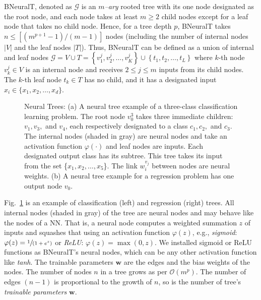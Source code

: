 \documentclass[11pt,a4paper]{article}
\begin{document}
    BNeuralT, denoted as $ \mathcal{G} $ is an \textit{$ m $--ary} rooted tree with its one node designated as the root node, and each node takes at least $ m \ge 2$ child nodes except for a leaf node that takes no child node. Hence, for a tree depth $ p $, BNeuralT takes $ n \le [(m^{p+1}-1)/(m-1)]$ nodes (including the number of internal nodes $ |V| $ and the leaf nodes $|T|$). Thus, BNeuralT can be defined as a union of internal and leaf nodes    
$
    \mathcal{G} = V \cup T = \left\lbrace v^j_1,v^j_2,\ldots,v^j_K \right\rbrace  \cup \left\lbrace t_1, t_2,\ldots, t_L \right\rbrace 
    $
where $ k $-th node $ v^j_k \in V$ is an internal node and receives $ 2 \le j \le m $ inputs from its child nodes. The $ k $-th leaf node $ t_k \in T$ has no child, and it has a designated input $ x_i \in  \{x_1,x_2,\ldots,x_d\}$. 
    
    \begin{figure}
        \centering
        \caption{Neural Trees: (a) A neural tree example of a three-class classification learning problem. The root node $ v^3_0 $ takes three immediate children: $ v_1, v_3, $ and $ v_4 $, each respectively designated to a class $ c_1, c_2, $ and $ c_3 $. The internal nodes (shaded in gray) are neural nodes and take an activation function $ \varphi(\cdot) $ and leaf nodes are inputs. Each designated output class has its subtree. This tree takes its input from the set \{$x_1, x_2, \ldots, x_5$\}. The link $ w_i^{v_j} $ between nodes are neural weights. (b) A neural tree example for a regression  problem has one output node $ v_0 $.}
        \label{fig:neural_tree}
    \end{figure}
    
    Fig.~\ref{fig:neural_tree} is an example of classification (left) and regression (right) trees. All internal nodes (shaded in gray) of the tree are neural nodes and may behave like the nodes of a NN. That is, a neural node computes a weighted summation $z$ of inputs and squashes that using an activation function $ \varphi(z)$, e.g., \textit{sigmoid}: $ \varphi(z) = \sfrac{1}{(1 + e^{z})} $ or \textit{ReLU}: $ \varphi(z) = \max(0,z) $. We installed sigmoid or ReLU functions as BNeuralT's neural nodes, which can be any other activation function like \textit{tanh}. The trainable parameters $ \textbf{w} $ are the edges and the bias weights of the nodes. The number of nodes $ n $ in a tree grows as per $ \mathcal{O}(m^p) $. The number of edges $(n-1) $ is proportional to the growth of $ n $, so is the number of tree's \textit{trainable parameters} $ \textbf{w} $.
    
\end{document}
